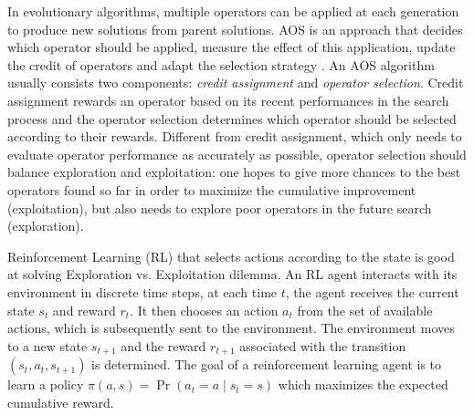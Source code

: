 \documentclass[journal]{IEEEtran}
\begin{document}
In evolutionary algorithms, multiple operators can be applied at each generation to produce new solutions from parent solutions.
AOS is an approach that decides which operator should be applied, measure the effect of this application, update the credit of operators and adapt the selection strategy \cite{li2011multi}.
An AOS algorithm usually consists two components: \textit{credit assignment} and \textit{operator selection}. Credit assignment rewards an operator based on its recent performances in the search process and the operator selection determines which operator should be selected according to their rewards.
Different from credit assignment, which only needs to evaluate operator performance as accurately as possible, operator selection should balance exploration and exploitation: one hopes to give more chances to the best operators found so far in order to maximize the cumulative improvement (exploitation), but also needs to explore poor operators in the future search (exploration).

Reinforcement Learning (RL) that selects actions according to the state is good at solving Exploration vs. Exploitation dilemma.
An RL agent interacts with its environment in discrete time steps, at each time $t$, the agent receives the current state $s_t$ and reward $r_t$. It then chooses an action $a_t$ from the set of available actions, which is subsequently sent to the environment. The environment moves to a new state $s_{t+1}$ and the reward $r_{t+1}$ associated with the transition $(s_t, a_t, s_{t+1})$ is determined. The goal of a reinforcement learning agent is to learn a policy $\pi(a, s)=\operatorname{Pr}\left(a_{t}=a \mid s_{t}=s\right)$ which maximizes the expected cumulative reward.
\end{document}
